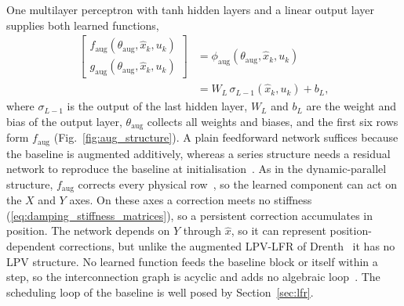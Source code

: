 One multilayer perceptron with tanh hidden layers and a linear output layer
supplies both learned functions,
\begin{equation}
\begin{aligned}
 \begin{bmatrix}
  f_{\mathrm{aug}}(\theta_{\mathrm{aug}},\hat x_k,u_k)\\
  g_{\mathrm{aug}}(\theta_{\mathrm{aug}},\hat x_k,u_k)
 \end{bmatrix}
 &=\phi_{\mathrm{aug}}(\theta_{\mathrm{aug}},\hat x_k,u_k)\\
 &=W_L\,\sigma_{L-1}(\hat x_k,u_k)+b_L,
\end{aligned}
 \label{eq:aug_network}
\end{equation}
where $\sigma_{L-1}$ is the output of the last hidden layer, $W_L$ and $b_L$
are the weight and bias of the output layer, $\theta_{\mathrm{aug}}$ collects
all weights and biases, and the first six rows form $f_{\mathrm{aug}}$
(Fig.~\ref{fig:aug_structure}).
A plain feedforward network suffices because the baseline is augmented
additively, whereas a series structure needs a residual network to reproduce
the baseline at initialisation~\cite[Sec.~4.3]{hoekstra2025lfr}.
As in the dynamic-parallel structure, $f_{\mathrm{aug}}$ corrects every
physical row~\cite[Sec.~2]{hoekstra2025lfr}, so the learned component can act
on the $X$ and $Y$ axes.
On these axes a correction meets no stiffness
(\eqref{eq:damping_stiffness_matrices}), so a persistent correction
accumulates in position.
The network depends on $Y$ through $\hat x$, so it can represent
position-dependent corrections, but unlike the augmented LPV-LFR of
Drenth~\cite[Eq.~(5.2)]{drenth2025thesis} it has no LPV structure.
No learned function feeds the baseline block or itself within a step, so the
interconnection graph is acyclic and adds no algebraic
loop~\cite[Thm.~1]{hoekstra2025lfr}.
The scheduling loop of the baseline is well posed by
Section~\ref{sec:lfr}.

